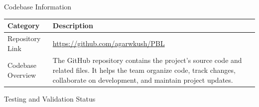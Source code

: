 \documentclass[12pt,a4paper]{article}
\newcommand{\sectiontitle}[1]{%
    {\color{GEUBlue}
    \fontsize{18}{22}\selectfont #1}
}
\newcommand{\instruction}[1]{%
    {\color{InstructionGrey}
    \fontsize{10.5}{13}\selectfont #1}
}
\begin{document}

\vspace*{0.20cm}




\sectiontitle{Codebase Information}

\vspace{0.55cm}

\begin{tabularx}{\textwidth}{
|>{\raggedright\arraybackslash}p{}
|>{\raggedright\arraybackslash}X|
}
\hline
\textbf{Category} & \textbf{Description} \\
\hline

Repository Link &
\url{https://github.com/agarwkush/PBL} \\
\hline

Codebase Overview &
The GitHub repository contains the project's source code and related files. It helps the team organize code, track changes, collaborate on development, and maintain project updates. \\
\hline

\end{tabularx}


\vspace{0.25cm}

\sectiontitle{Testing and Validation Status}

\vspace{0.05cm}

\instruction{}

\vspace{0.30cm}
\end{document}
